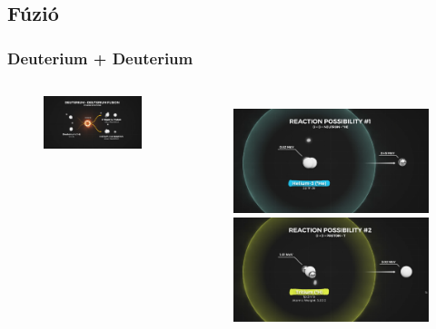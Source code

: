 \documentclass{beamer}
\begin{document}
\subsection{Fúzió}
\begin{frame}
    \frametitle{Deuterium + Deuterium}
    \begin{columns}
        \begin{figure}
            \includegraphics[scale=0.12]{d_d_fusion.png}
        \end{figure}   
        \begin{figure}
            \includegraphics[scale=0.07]{d_d_fusion_possibility_1.png}
            \includegraphics[scale=0.07]{d_d_fusion_possibility_2.png}
        \end{figure}   
    \end{columns}
\end{frame}
\end{document}
